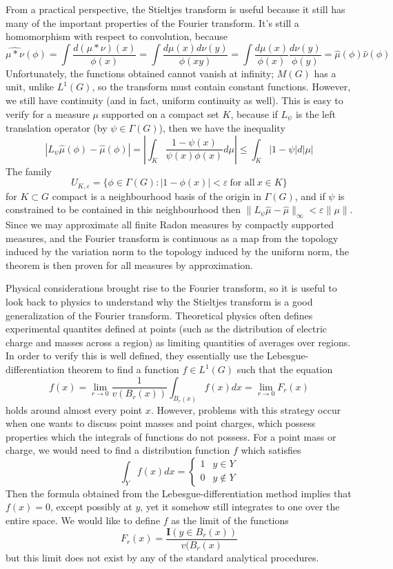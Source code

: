 \documentclass{article}
\theoremstyle{plain}
\theoremstyle{definition}
\begin{document}
From a practical perspective, the Stieltjes transform is useful because it still has many of the important properties of the Fourier transform. It's still a homomorphism with respect to convolution, because
%
\[ \widehat{\mu * \nu}(\phi) = \int \frac{d(\mu * \nu)(x)}{\phi(x)} = \int \frac{d \mu (x) d \nu(y)}{\phi(xy)} = \int \frac{d \mu(x)}{\phi(x)} \frac{d \nu(y)}{\phi(y)} = \widehat{\mu}(\phi) \widehat{\nu}(\phi) \]
%
Unfortunately, the functions obtained cannot vanish at infinity; $M(G)$ has a unit, unlike $L^1(G)$, so the transform must contain constant functions. However, we still have continuity (and in fact, uniform continuity as well). This is easy to verify for a measure $\mu$ supported on a compact set $K$, because if $L_\psi$ is the left translation operator (by $\psi \in \Gamma(G)$), then we have the inequality
%
\[ | L_\psi \widehat{\mu}(\phi) - \widehat{\mu}(\phi)| = \left| \int_K \frac{1 - \psi(x)}{\psi(x) \phi(x)} d\mu \right| \leq \int_K |1 - \psi| d|\mu| \]
%
The family
%
\[ U_{K,\varepsilon} = \{ \phi \in \Gamma(G) : |1 - \phi(x)| < \varepsilon\ \text{for all}\ x \in K \} \]
%
for $K \subset G$ compact is a neighbourhood basis of the origin in $\Gamma(G)$, and if $\psi$ is constrained to be contained in this neighbourhood then $\| L_\psi \widehat{\mu} - \widehat{\mu} \|_\infty < \varepsilon \| \mu \|$. Since we may approximate all finite Radon measures by compactly supported measures, and the Fourier transform is continuous as a map from the topology induced by the variation norm to the topology induced by the uniform norm, the theorem is then proven for all measures by approximation.

Physical considerations brought rise to the Fourier transform, so it is useful to look back to physics to understand why the Stieltjes transform is a good generalization of the Fourier transform. Theoretical physics often defines experimental quantites defined at points (such as the distribution of electric charge and masses across a region) as limiting quantities of averages over regions. In order to verify this is well defined, they essentially use the Lebesgue-differentiation theorem to find a function $f \in L^1(G)$ such that the equation
%
\[ f(x) = \lim_{r \to 0} \frac{1}{v(B_r(x))} \int_{B_r(x)} f(x) dx = \lim_{r \to 0} F_r(x) \]
%
holds around almost every point $x$. However, problems with this strategy occur when one wants to discuss point masses and point charges, which possess properties which the integrals of functions do not possess. For a point mass or charge, we would need to find a distribution function $f$ which satisfies
%
\[ \int_Y f(x) dx = \begin{cases} 1 & y \in Y \\ 0 & y \not \in Y \end{cases} \]
%
Then the formula obtained from the Lebesgue-differentiation method implies that $f(x) = 0$, except possibly at $y$, yet it somehow still integrates to one over the entire space. We would like to define $f$ as the limit of the functions
%
\[ F_r(x) = \frac{\mathbf{I}(y \in B_r(x))}{v(B_r(x)} \]
%
but this limit does not exist by any of the standard analytical procedures.
\end{document}
